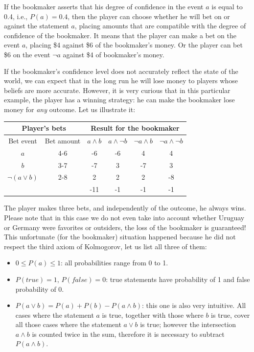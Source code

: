 \documentclass[notitlepage,oneside]{book}
\begin{document}
If the bookmaker asserts that his degree of confidence in the event $a$ is equal to 0.4, i.e., $P(a) = 0.4$, 
then the player can choose whether he will bet on or against the statement $a$,
placing amounts that are compatible with the degree of confidence of the bookmaker.
It means that the player can make a bet on the event $a$, placing \$4 against \$6 of the bookmaker's money.
Or the player can bet \$6 on the event $\neg a$ against \$4 of bookmaker's money.

If the bookmaker's confidence level does not accurately reflect the state of the world, 
we can expect that in the long run he will lose money to players whose beliefs are more accurate.
However, it is very curious that in this particular example, the player has a winning strategy: he can make the bookmaker lose money for \textit{any} outcome.
Let us illustrate it:

\vspace{2mm}
\begin{tabular}{cccccc}
	\multicolumn{2}{c}{Player's bets}  &  \multicolumn{4}{c}{Result for the bookmaker} \\
	\hline
	{\tiny Bet event} & {\tiny Bet amount} & {\tiny $a\wedge b$} & {\tiny $a\wedge \neg b$} &  {\tiny $\neg a\wedge b$} &  {\tiny $\neg a\wedge\neg b$} \\
	\hline
	$a$             & 4-6 & -6 & -6 &  4 &  4 \\
	$b$             & 3-7 & -7 &  3 & -7 &  3 \\
	$\neg(a\vee b)$ & 2-8 &  2 &  2 &  2 & -8 \\
	\hline
	&     &-11 & -1 & -1 & -1
\end{tabular}
\vspace{2mm}

The player makes three bets, and independently of the outcome, he always wins. 
Please note that in this case we do not even take into account whether Uruguay or Germany were favorites or outsiders, 
the loss of the bookmaker is guaranteed! 
This unfortunate (for the bookmaker) situation happened because he did not respect the third axiom of Kolmogorov, let us list all three of them:
\begin{itemize}
\item $0\leq P(a)\leq 1$: all probabilities range from 0 to 1.
\item $P(true)=1$, $P(false) = 0$: true statements have probability of 1 and false probability of 0.
\item $P(a\vee b) = P(a) + P(b) - P(a\wedge b)$: this one is also very intuitive.
All cases where the statement $a$ is true, together with those where $b$ is true,
cover all those cases where the statement $a\vee b$ is true; however the intersection $a\wedge b$ is counted twice in the sum, therefore it is necessary to subtract $P(a\wedge b)$.
\end{itemize}
\end{document}
